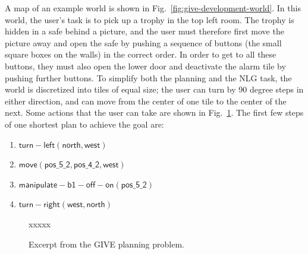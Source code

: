 A map of an example world is shown in
Fig.~\ref{fig:give-development-world}.  In this world, the user's task
is to pick up a trophy in the top left room.  The trophy is hidden in
a safe behind a picture, and the user must therefore first move the
picture away and open the safe by pushing a sequence of buttons (the
small square boxes on the walls) in the correct order.  In order to
get to all these buttons, they must also open the lower door and
deactivate the alarm tile by pushing further buttons.  To simplify
both the planning and the NLG task, the world is discretized into
tiles of equal size; the user can turn by 90 degree steps in either
direction, and can move from the center of one tile to the center of
the next.  Some actions that the user can take are shown in
Fig.~\ref{fig:give-planning}.  The first few steps of one shortest
plan to achieve the goal are:
\begin{enumerate}
\item $\mathsf{turn-left}(\mathsf{north}, \mathsf{west})$
\item $\mathsf{move}(\mathsf{pos\_5\_2}, \mathsf{pos\_4\_2}, \mathsf{west})$
\item $\mathsf{manipulate-b1-off-on}(\mathsf{pos\_5\_2})$
\item $\mathsf{turn-right}(\mathsf{west}, \mathsf{north})$
\end{enumerate}

\begin{figure}
  \centering
  xxxxx
  \caption{Excerpt from the GIVE planning problem.}
  \label{fig:give-planning}
\end{figure}

